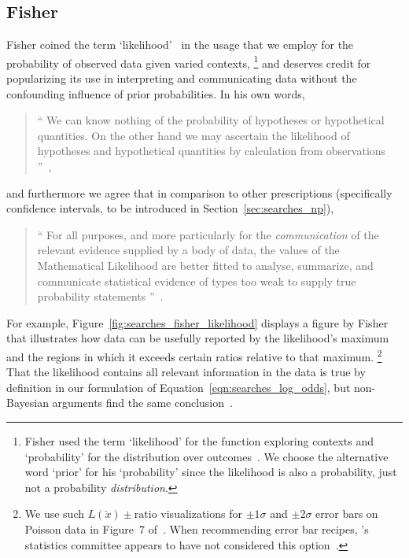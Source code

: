\subsection{Fisher}
\label{sec:searches_fisher}
Fisher coined the term `likelihood'~\cite{
fisher1912fitting,
fisher1915frequency,
fisher1921probable,
fisher1922estimators
} in the usage that
we employ for the probability of observed data given varied
contexts,%
\footnote{%
Fisher used the term `likelihood' for the function exploring
contexts and `probability' for the distribution over
outcomes~\cite{fisher1925smrw}.
We choose the alternative word `prior' for his `probability' since the
likelihood is also a probability, just not a probability \emph{distribution}.
}
and deserves credit for popularizing its use in interpreting and communicating
data without the confounding influence of prior probabilities.
In his own words,%
\begin{quote}
\small
``%
We can know nothing of the probability of hypotheses or hypothetical
quantities.
On the other hand we may ascertain the likelihood of hypotheses
and hypothetical quantities by calculation from observations%
''~\cite{fisher1921probable},
\end{quote}
and furthermore we agree that in comparison to other prescriptions
(specifically confidence intervals, to be introduced in
Section~\ref{sec:searches_np}),
\begin{quote}
\small
``%
For all purposes, and more particularly for the \textit{communication} of the
relevant evidence supplied by a body of data, the values of the Mathematical
Likelihood are better fitted to analyse, summarize, and communicate
statistical evidence of types too weak to supply true probability statements%
''~\cite{fisher1956statistical}.
\end{quote}
For example, Figure~\ref{fig:searches_fisher_likelihood} displays a figure by
Fisher~\cite{fisher1956statistical} that illustrates how data can be usefully
reported by the likelihood's maximum and the regions in which it exceeds
certain ratios relative to that maximum.%
\footnote{%
We use such $L(\check{x})\pm\mathrm{ratio}$ visualizations for
$\pm1\sigma$ and $\pm2\sigma$ error bars on Poisson data in
Figure~7 of~\cite{lester2022hunting}.
When recommending error bar recipes, \atlas's statistics committee appears
to have not considered this option~\cite{cowan2011errorbars}.
}
That the likelihood contains all relevant information in the data is true by
definition in our formulation of Equation~\ref{eqn:searches_log_odds},
but non-Bayesian arguments find the same conclusion~\cite{
birnbaum1962foundations,
savage1962foundations
}.

